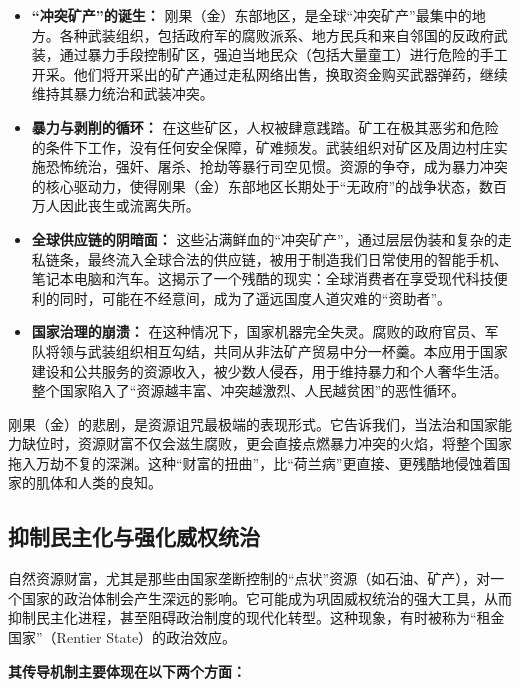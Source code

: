 \begin{itemize}
    \item \textbf{“冲突矿产”的诞生：} 刚果（金）东部地区，是全球“冲突矿产”最集中的地方。各种武装组织，包括政府军的腐败派系、地方民兵和来自邻国的反政府武装，通过暴力手段控制矿区，强迫当地民众（包括大量童工）进行危险的手工开采。他们将开采出的矿产通过走私网络出售，换取资金购买武器弹药，继续维持其暴力统治和武装冲突。
    \item \textbf{暴力与剥削的循环：} 在这些矿区，人权被肆意践踏。矿工在极其恶劣和危险的条件下工作，没有任何安全保障，矿难频发。武装组织对矿区及周边村庄实施恐怖统治，强奸、屠杀、抢劫等暴行司空见惯。资源的争夺，成为暴力冲突的核心驱动力，使得刚果（金）东部地区长期处于“无政府”的战争状态，数百万人因此丧生或流离失所。
    \item \textbf{全球供应链的阴暗面：} 这些沾满鲜血的“冲突矿产”，通过层层伪装和复杂的走私链条，最终流入全球合法的供应链，被用于制造我们日常使用的智能手机、笔记本电脑和汽车。这揭示了一个残酷的现实：全球消费者在享受现代科技便利的同时，可能在不经意间，成为了遥远国度人道灾难的“资助者”。
    \item \textbf{国家治理的崩溃：} 在这种情况下，国家机器完全失灵。腐败的政府官员、军队将领与武装组织相互勾结，共同从非法矿产贸易中分一杯羹。本应用于国家建设和公共服务的资源收入，被少数人侵吞，用于维持暴力和个人奢华生活。整个国家陷入了“资源越丰富、冲突越激烈、人民越贫困”的恶性循环。
\end{itemize}

刚果（金）的悲剧，是资源诅咒最极端的表现形式。它告诉我们，当法治和国家能力缺位时，资源财富不仅会滋生腐败，更会直接点燃暴力冲突的火焰，将整个国家拖入万劫不复的深渊。这种“财富的扭曲”，比“荷兰病”更直接、更残酷地侵蚀着国家的肌体和人类的良知。

\subsection{抑制民主化与强化威权统治}

自然资源财富，尤其是那些由国家垄断控制的“点状”资源（如石油、矿产），对一个国家的政治体制会产生深远的影响。它可能成为巩固威权统治的强大工具，从而抑制民主化进程，甚至阻碍政治制度的现代化转型。这种现象，有时被称为“租金国家”（Rentier State）的政治效应。

\textbf{其传导机制主要体现在以下两个方面：}

